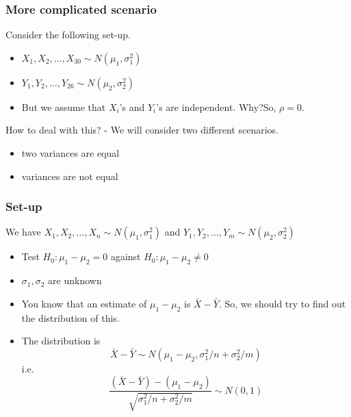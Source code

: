 \documentclass{beamer}\usepackage[]{graphicx}\usepackage[]{color}
\begin{document}
\begin{frame}[fragile]

\frametitle{More complicated scenario}

Consider the following set-up.

\begin{itemize}
\item $X_1,X_2,\hdots,X_{30} \sim N(\mu_1,\sigma_1^2)$ 
\item $Y_1,Y_2,\hdots,Y_{26} \sim N(\mu_2,\sigma_2^2)$  \pause
\item But we assume that $X_i$'s and $Y_i$'s are independent. Why?\pause So, $\rho=0$.
\end{itemize} 

How to deal with this? - We will consider two different scenarios. \pause
\begin{itemize}
\item two variances are equal
\item variances are not equal
\end{itemize}

\end{frame}

\begin{frame}

\frametitle{Set-up}

We have $X_1,X_2,\hdots,X_n \sim N(\mu_1,\sigma_1^2)$  and $Y_1,Y_2,\hdots,Y_m \sim N(\mu_2,\sigma_2^2)$ \pause

\begin{itemize}
\item Test $H_0: \mu_1-\mu_2=0$ against $H_0: \mu_1-\mu_2\ne 0$ \pause
\item $\sigma_1,\sigma_2$ are unknown \pause
\item You know that an estimate of $\mu_1-\mu_2$ is $\bar X-\bar Y$. So, we should try to find out the distribution of this. \pause
\item The distribution is $$\bar X-\bar Y \sim N(\mu_1-\mu_2,\sigma_1^2/n+\sigma_2^2/m)$$ 
 i.e. $$ \frac{(\bar X-\bar Y)-(\mu_1-\mu_2)}{\sqrt{\sigma_1^2/n+\sigma_2^2/m}} \sim N(0,1)$$
\end{itemize}

\end{frame}
\end{document}
